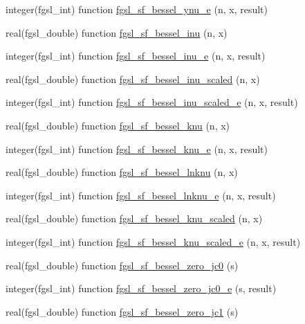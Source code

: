 \begin{DoxyCompactItemize}
integer(fgsl\+\_\+int) function \hyperlink{specfunc_8finc_aaa4e71884b289a2a52e6827a6eca9163}{fgsl\+\_\+sf\+\_\+bessel\+\_\+ynu\+\_\+e} (n, x, result)
\item 
real(fgsl\+\_\+double) function \hyperlink{specfunc_8finc_a1fed6ab1d4221c89be58f1e79a528230}{fgsl\+\_\+sf\+\_\+bessel\+\_\+inu} (n, x)
\item 
integer(fgsl\+\_\+int) function \hyperlink{specfunc_8finc_a8aa2ba9a048cc5ea1e075070a497ee72}{fgsl\+\_\+sf\+\_\+bessel\+\_\+inu\+\_\+e} (n, x, result)
\item 
real(fgsl\+\_\+double) function \hyperlink{specfunc_8finc_ac81f883430311e81a4c1014f558b5a2e}{fgsl\+\_\+sf\+\_\+bessel\+\_\+inu\+\_\+scaled} (n, x)
\item 
integer(fgsl\+\_\+int) function \hyperlink{specfunc_8finc_aff47bcb8483e57dc967dc3af2333337e}{fgsl\+\_\+sf\+\_\+bessel\+\_\+inu\+\_\+scaled\+\_\+e} (n, x, result)
\item 
real(fgsl\+\_\+double) function \hyperlink{specfunc_8finc_af4e2055bacde99b9ec42b58de6d9ccf1}{fgsl\+\_\+sf\+\_\+bessel\+\_\+knu} (n, x)
\item 
integer(fgsl\+\_\+int) function \hyperlink{specfunc_8finc_ad59eb26cf0d188829b69d2a0fbf62121}{fgsl\+\_\+sf\+\_\+bessel\+\_\+knu\+\_\+e} (n, x, result)
\item 
real(fgsl\+\_\+double) function \hyperlink{specfunc_8finc_ab96aff271057d2eec6c792a8e9b7139b}{fgsl\+\_\+sf\+\_\+bessel\+\_\+lnknu} (n, x)
\item 
integer(fgsl\+\_\+int) function \hyperlink{specfunc_8finc_aed7316a251f3d85c7984974a4bd7fd83}{fgsl\+\_\+sf\+\_\+bessel\+\_\+lnknu\+\_\+e} (n, x, result)
\item 
real(fgsl\+\_\+double) function \hyperlink{specfunc_8finc_a2abcdcc3f6a98141e4a3e7e825352f05}{fgsl\+\_\+sf\+\_\+bessel\+\_\+knu\+\_\+scaled} (n, x)
\item 
integer(fgsl\+\_\+int) function \hyperlink{specfunc_8finc_a2766197eb341e83dd19cd3906760f3f1}{fgsl\+\_\+sf\+\_\+bessel\+\_\+knu\+\_\+scaled\+\_\+e} (n, x, result)
\item 
real(fgsl\+\_\+double) function \hyperlink{specfunc_8finc_a04a84cf0899f959c847effbbc7097fdc}{fgsl\+\_\+sf\+\_\+bessel\+\_\+zero\+\_\+jc0} (s)
\item 
integer(fgsl\+\_\+int) function \hyperlink{specfunc_8finc_a037e54be265dc2efed30af169b68e7b4}{fgsl\+\_\+sf\+\_\+bessel\+\_\+zero\+\_\+jc0\+\_\+e} (s, result)
\item 
real(fgsl\+\_\+double) function \hyperlink{specfunc_8finc_aa0aae64cbda6d484991901f401cb31ce}{fgsl\+\_\+sf\+\_\+bessel\+\_\+zero\+\_\+jc1} (s)

\end{DoxyCompactItemize}
